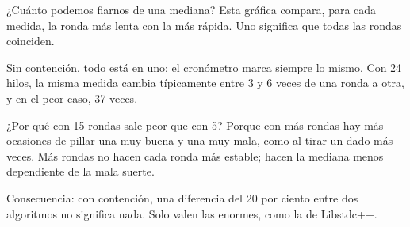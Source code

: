 ¿Cuánto podemos fiarnos de una mediana? Esta gráfica compara, para cada medida, la ronda más lenta con la más rápida. Uno significa que todas las rondas coinciden.

Sin contención, todo está en uno: el cronómetro marca siempre lo mismo. Con 24 hilos, la misma medida cambia típicamente entre 3 y 6 veces de una ronda a otra, y en el peor caso, 37 veces.

¿Por qué con 15 rondas sale peor que con 5? Porque con más rondas hay más ocasiones de pillar una muy buena y una muy mala, como al tirar un dado más veces. Más rondas no hacen cada ronda más estable; hacen la mediana menos dependiente de la mala suerte.

Consecuencia: con contención, una diferencia del 20 por ciento entre dos algoritmos no significa nada. Solo valen las enormes, como la de Libstdc++.
